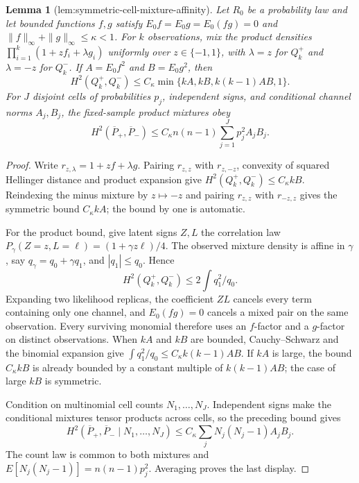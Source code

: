 \documentclass{article}
\newtheorem{lemma}{Lemma}
\begin{document}
\begin{lemma}[lem:symmetric-cell-mixture-affinity]\label{lem:symmetric-cell-mixture-affinity}
Let \(R_0\) be a probability law and let bounded functions \(f,g\) satisfy \(E_0f=E_0g=E_0(fg)=0\) and \(\|f\|_\infty+\|g\|_\infty\le\kappa<1\). For \(k\) observations, mix the product densities \(\prod_{i=1}^k(1+zf_i+\lambda g_i)\) uniformly over \(z\in\{-1,1\}\), with \(\lambda=z\) for \(Q_k^+\) and \(\lambda=-z\) for \(Q_k^-\). If \(A=E_0f^2\) and \(B=E_0g^2\), then
\[
H^2(Q_k^+,Q_k^-)\le C_\kappa\min\{kA,kB,k(k-1)AB,1\}.
\]
For \(J\) disjoint cells of probabilities \(p_j\), independent signs, and conditional channel norms \(A_j,B_j\), the fixed-sample product mixtures obey
\[
H^2(\overline P_+,\overline P_-)\le C_\kappa n(n-1)\sum_{j=1}^Jp_j^2A_jB_j.
\]
\end{lemma}
\begin{proof}
Write \(r_{z,\lambda}=1+zf+\lambda g\). Pairing \(r_{z,z}\) with \(r_{z,-z}\), convexity of squared Hellinger distance and product expansion give \(H^2(Q_k^+,Q_k^-)\le C_\kappa kB\). Reindexing the minus mixture by \(z\mapsto-z\) and pairing \(r_{z,z}\) with \(r_{-z,z}\) gives the symmetric bound \(C_\kappa kA\); the bound by one is automatic.

For the product bound, give latent signs \(Z,L\) the correlation law \(P_\gamma(Z=z,L=\ell)=(1+\gamma z\ell)/4\). The observed mixture density is affine in \(\gamma\), say \(q_\gamma=q_0+\gamma q_1\), and \(|q_1|\le q_0\). Hence
\[
H^2(Q_k^+,Q_k^-)\le2\int q_1^2/q_0.
\]
Expanding two likelihood replicas, the coefficient \(ZL\) cancels every term containing only one channel, and \(E_0(fg)=0\) cancels a mixed pair on the same observation. Every surviving monomial therefore uses an \(f\)-factor and a \(g\)-factor on distinct observations. When \(kA\) and \(kB\) are bounded, Cauchy--Schwarz and the binomial expansion give \(\int q_1^2/q_0\le C_\kappa k(k-1)AB\). If \(kA\) is large, the bound \(C_\kappa kB\) is already bounded by a constant multiple of \(k(k-1)AB\); the case of large \(kB\) is symmetric.

Condition on multinomial cell counts \(N_1,\ldots,N_J\). Independent signs make the conditional mixtures tensor products across cells, so the preceding bound gives
\[
H^2(\overline P_+,\overline P_-\mid N_1,\ldots,N_J)\le C_\kappa\sum_jN_j(N_j-1)A_jB_j.
\]
The count law is common to both mixtures and \(E[N_j(N_j-1)]=n(n-1)p_j^2\). Averaging proves the last display.
\end{proof}
\end{document}
